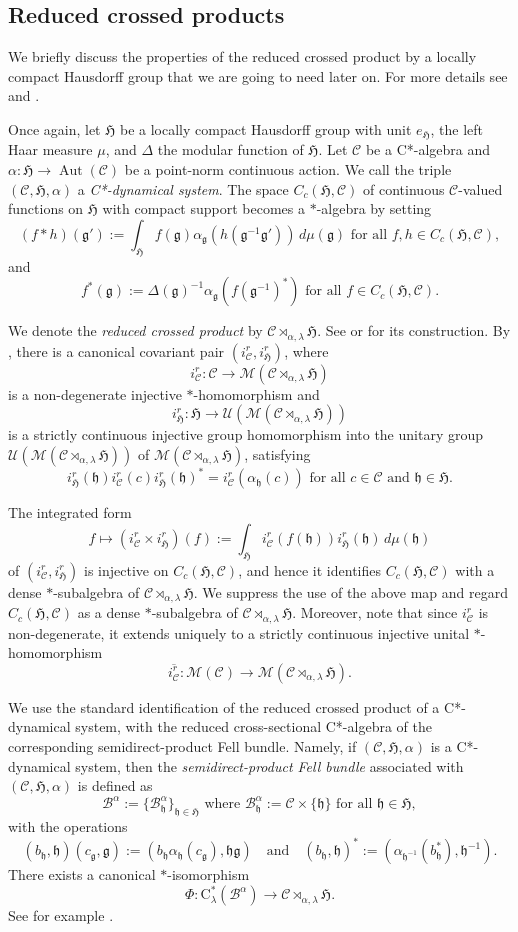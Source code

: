\documentclass[11pt,final]{amsart}
\numberwithin{equation}{section}
\theoremstyle{plain}
\theoremstyle{definition}
\theoremstyle{remark}
\newcommand{\B}{{\mathcal{B}}}
\newcommand{\C}{{\mathcal{C}}}
\newcommand{\M}{{\mathcal{M}}}
\newcommand{\U}{{\mathcal{U}}}
\def\al{\alpha}
\def\De{\Delta}
\def\la{\lambda}
\newcommand{\fg}{{\mathfrak{g}}}
\newcommand{\fH}{{\mathfrak{H}}}
\newcommand{\fh}{{\mathfrak{h}}}
\newcommand{\foral}{\text{ for all }}
\newcommand{\qand}{\quad\text{and}\quad}
\newcommand{\ca}{\mathrm{C}^*}
\newcommand{\ol}{\overline}
\newcommand{\Aut}{\operatorname{Aut}}
\begin{document}
\subsection{Reduced crossed products}\label{Ss:Cross}
We briefly discuss the properties of the reduced crossed product by a locally compact Hausdorff group that we are going to need later on. For more details see \cite[Chapter 7]{Wil07} and \cite[Appendix A]{EKQR06}.

Once again, let $\fH$ be a locally compact Hausdorff group with unit $e_{\fH}$, the left Haar measure $\mu$, and $\De$ the modular function of $\fH$.
Let $\C$ be a C*-algebra and $\al \colon \fH \to \Aut(\C)$ be a point-norm continuous action. We call the triple $(\C,\fH,\al)$ a \emph{C*-dynamical system}. The space 
$C_c(\fH,\C)$ of continuous $\C$-valued functions on $\fH$ with compact support becomes a $*$-algebra  by setting
\[
(f \ast h)(\fg')
:=
\int_{\fH}f(\fg)\al_{\fg}(h(\fg^{-1}\fg')) \, d\mu(\fg)
\foral f,h\in C_c(\fH,\C),
\]
and
\[
f^*(\fg)
:=
\De(\fg)^{-1}\al_{\fg}(f(\fg^{-1})^*) \foral f\in C_c(\fH,\C).
\]

We denote the \emph{reduced crossed product} by $\C\rtimes_{\al,\la}\fH$.
See \cite[Definition~7.7 and Lemma~7.8]{Wil07} or
\cite[Appendix~A, Definition~A.13 and Remark~A.15]{EKQR06} for its
construction.  By \cite[Appendix~A, Definition~A.13]{EKQR06}, there is a
canonical covariant pair $(i_{\C}^r,i_{\fH}^r)$, where
\[
i_{\C}^r\colon\C\to\M(\C\rtimes_{\al,\la}\fH)
\]
is a non-degenerate injective $*$-homomorphism and
\[
i_{\fH}^r\colon\fH\to\U(\M(\C\rtimes_{\al,\la}\fH))
\]
is a strictly continuous injective group homomorphism into the unitary group $\U(\M(\C\rtimes_{\al,\la}\fH))$ of $\M(\C\rtimes_{\al,\la}\fH)$, satisfying
\[
i_{\fH}^r(\fh)i_{\C}^r(c)i_{\fH}^r(\fh)^*
=
i_{\C}^r(\al_{\fh}(c))
\foral c\in\C \text{ and } \fh\in\fH.
\]

The integrated form 
\[
f
\longmapsto
(i_{\C}^r\times i_{\fH}^r)(f)
:=
\int_{\fH} i^r_{\C}(f(\fh)) i_\fH^r(\fh) \, d\mu(\fh)
\]
of $(i_{\C}^r,i_{\fH}^r)$ is injective on $C_c(\fH,\C)$, and hence it identifies $C_c(\fH,\C)$ with a dense
$*$-subalgebra of $\C\rtimes_{\al,\la}\fH$.
We suppress the use of the above map and regard $C_c(\fH,\C)$ as a dense $*$-subalgebra of $\C\rtimes_{\al,\la}\fH$.
Moreover, note that since $i_{\C}^r$ is non-degenerate, it extends uniquely to a strictly continuous injective unital $*$-homomorphism
\[
\ol{i_{\C}^r}\colon\M(\C)\to\M(\C\rtimes_{\al,\la}\fH).
\]

We use the standard identification of the reduced crossed product of a C*-dynamical system, with the reduced cross-sectional C*-algebra of the corresponding semidirect-product Fell bundle.  Namely, if $(\C,\fH,\al)$ is  a C*-dynamical system, then the \emph{semidirect-product Fell bundle} associated with $(\C,\fH,\al)$ is defined as
\[
\B^\al:=\{\B^\al_{\fh}\}_{\fh\in\fH} \text{ where } \B^\al_{\fh}:=\C\times\{\fh\} \foral \fh \in \fH,
\]
with the operations
\[
(b_{\fh},\fh)(c_{\fg},\fg):=(b_{\fh}\al_{\fh}(c_{\fg}),\fh\fg)
\qand
(b_{\fh},\fh)^*:=(\al_{\fh^{-1}}(b_{\fh}^*),\fh^{-1}).
\]
There exists a canonical $*$-isomorphism 
\[
\Phi \colon \ca_\la(\B^\al) \to \C\rtimes_{\al,\la}\fH.
\]
See for example \cite[Section~2]{EN02}.
\end{document}
